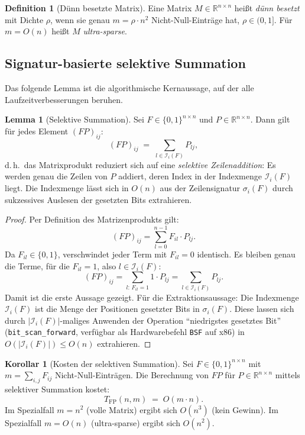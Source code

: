 ﻿\documentclass[a4paper,12pt]{article}
\theoremstyle{definition}
\newtheorem{definition}{Definition}
\newtheorem{lemma}{Lemma}
\newtheorem{korollar}{Korollar}
\begin{document}
\begin{definition}[Dünn besetzte Matrix]
    Eine Matrix $M \in \mathbb{R}^{n \times n}$ heißt \emph{dünn besetzt} mit
    Dichte $\rho$, wenn sie genau $m = \rho \cdot n^2$ Nicht-Null-Einträge hat,
    $\rho \in (0,1]$. Für $m = O(n)$ heißt $M$ \emph{ultra-sparse}.
\end{definition}

\subsection{Signatur-basierte selektive Summation}

Das folgende Lemma ist die algorithmische Kernaussage, auf der alle
Laufzeitverbesserungen beruhen.

\begin{lemma}[Selektive Summation]
\label{lem:selsum}
    Sei $F \in \{0,1\}^{n \times n}$ und $P \in \mathbb{R}^{n \times n}$.
    Dann gilt für jedes Element $(FP)_{ij}$:
    \[
        (FP)_{ij} \;=\; \sum_{l \in \mathcal{I}_i(F)} P_{lj},
    \]
    d.\,h.\ das Matrixprodukt reduziert sich auf eine \emph{selektive Zeilenaddition}:
    Es werden genau die Zeilen von $P$ addiert, deren Index in der Indexmenge
    $\mathcal{I}_i(F)$ liegt. Die Indexmenge lässt sich in $O(n)$ aus der
    Zeilensignatur $\sigma_i(F)$ durch sukzessives Auslesen der gesetzten Bits extrahieren.
\end{lemma}

\begin{proof}
Per Definition des Matrizenprodukts gilt:
\[
    (FP)_{ij} = \sum_{l=0}^{n-1} F_{il} \cdot P_{lj}.
\]
Da $F_{il} \in \{0,1\}$, verschwindet jeder Term mit $F_{il} = 0$ identisch.
Es bleiben genau die Terme, für die $F_{il} = 1$, also $l \in \mathcal{I}_i(F)$:
\[
    (FP)_{ij} = \sum_{l:\, F_{il}=1} 1 \cdot P_{lj}
              = \sum_{l \in \mathcal{I}_i(F)} P_{lj}.
\]
Damit ist die erste Aussage gezeigt. Für die Extraktionsaussage:
Die Indexmenge $\mathcal{I}_i(F)$ ist die Menge der Positionen gesetzter Bits
in $\sigma_i(F)$. Diese lassen sich durch $|\mathcal{I}_i(F)|$-maliges Anwenden
der Operation ``niedrigstes gesetztes Bit'' (\texttt{bit\_scan\_forward}, verfügbar als
Hardwarebefehl \texttt{BSF} auf x86) in $O(|\mathcal{I}_i(F)|) \leq O(n)$ extrahieren.
\end{proof}

\begin{korollar}[Kosten der selektiven Summation]
\label{kor:selsum_cost}
    Sei $F \in \{0,1\}^{n \times n}$ mit $m = \sum_{i,j} F_{ij}$
    Nicht-Null-Einträgen. Die Berechnung von $FP$ für $P \in \mathbb{R}^{n\times n}$
    mittels selektiver Summation kostet:
    \[
        T_{\mathrm{FP}}(n, m) \;=\; O(m \cdot n).
    \]
    Im Spezialfall $m = n^2$ (volle Matrix) ergibt sich $O(n^3)$ (kein Gewinn).
    Im Spezialfall $m = O(n)$ (ultra-sparse) ergibt sich $O(n^2)$.
\end{korollar}
\end{document}
